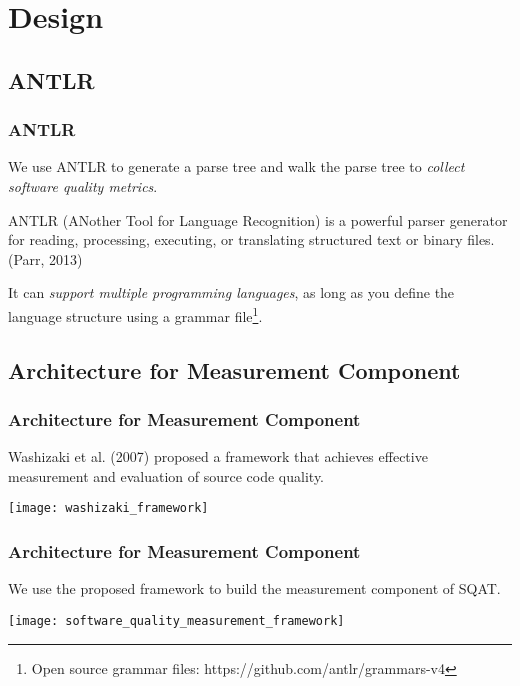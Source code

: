 \section{Design}

\subsection{ANTLR}
\begin{frame}
\frametitle{ANTLR}

We use ANTLR to generate a parse tree and walk the parse tree to \emph{collect software quality metrics}.

\begin{definition}
ANTLR (ANother Tool for Language Recognition) is a powerful parser generator for reading, processing, executing, or translating structured text or binary files. (Parr, 2013)
\end{definition}

It can \emph{support multiple programming languages}, as long as you define the language structure using a grammar file\footnote{Open source grammar files: https://github.com/antlr/grammars-v4}.

\end{frame}

\subsection{Architecture for Measurement Component}
\begin{frame}
\frametitle{Architecture for Measurement Component}
Washizaki et al. (2007) proposed a framework that achieves effective measurement and evaluation of source code quality.

\begin{center}
\texttt{[image: washizaki\_framework]}
\end{center}
\end{frame}

\begin{frame}
\frametitle{Architecture for Measurement Component}
We use the proposed framework to build the measurement component of SQAT.

\begin{center}
\texttt{[image: software\_quality\_measurement\_framework]}
\end{center}
\end{frame}

